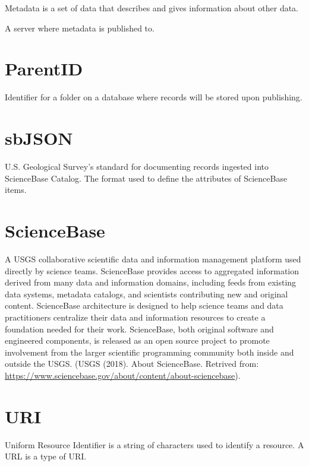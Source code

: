 \documentclass[
]{book}
\begin{document}
Metadata is a set of data that describes and gives information about other data.

A server where metadata is published to.

\hypertarget{parentid}{%
\section*{ParentID}\label{parentid}}

Identifier for a folder on a database where records will be stored upon publishing.

\hypertarget{sbjson}{%
\section*{sbJSON}\label{sbjson}}

U.S. Geological Survey's standard for documenting records ingested into ScienceBase Catalog. The format used to define the attributes of ScienceBase items.

\hypertarget{sciencebase}{%
\section*{ScienceBase}\label{sciencebase}}

A USGS collaborative scientific data and information management platform used directly by science teams. ScienceBase provides access to aggregated information derived from many data and information domains, including feeds from existing data systems, metadata catalogs, and scientists contributing new and original content. ScienceBase architecture is designed to help science teams and data practitioners centralize their data and information resources to create a foundation needed for their work. ScienceBase, both original software and engineered components, is released as an open source project to promote involvement from the larger scientific programming community both inside and outside the USGS. (USGS (2018). About ScienceBase. Retrived from: \url{https://www.sciencebase.gov/about/content/about-sciencebase}).

\hypertarget{uri}{%
\section*{URI}\label{uri}}

Uniform Resource Identifier is a string of characters used to identify a resource. A URL is a type of URI.

  

\printindex
\backmatter
\end{document}

